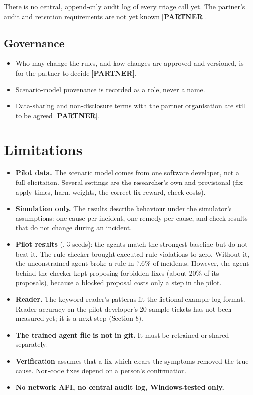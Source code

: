 \documentclass[11pt,a4paper]{article}
\newcommand{\code}[1]{\path{#1}}
\newcommand{\partner}{\textbf{[PARTNER]}}
\begin{document}
There is no central, append-only audit log of every triage call yet. The partner's audit and
retention requirements are not yet known \partner.

\subsection*{Governance}

\begin{itemize}
\item Who may change the rules, and how changes are approved and versioned, is for the partner to
  decide \partner.
\item Scenario-model provenance is recorded as a role, never a name.
\item Data-sharing and non-disclosure terms with the partner organisation are still to be
  agreed \partner.
\end{itemize}

\section{Limitations}

\begin{itemize}
\item \textbf{Pilot data.} The scenario model comes from one software developer, not a full
  elicitation. Several settings are the researcher's own and provisional (fix apply times, harm
  weights, the correct-fix reward, check costs).
\item \textbf{Simulation only.} The results describe behaviour under the simulator's assumptions:
  one cause per incident, one remedy per cause, and check results that do not change during an
  incident.
\item \textbf{Pilot results} (\code{documentation/pilot_report.md}, 3 seeds): the agents match the
  strongest baseline but do not beat it. The rule checker brought executed rule violations to
  zero. Without it, the unconstrained agent broke a rule in 7.6\% of incidents. However, the
  agent behind the checker kept proposing forbidden fixes (about 20\% of its proposals), because
  a blocked proposal costs only a step in the pilot.
\item \textbf{Reader.} The keyword reader's patterns fit the fictional example log format. Reader
  accuracy on the pilot developer's 20 sample tickets has not been measured yet; it is a next
  step (Section 8).
\item \textbf{The trained agent file is not in git.} It must be retrained or shared separately.
\item \textbf{Verification} assumes that a fix which clears the symptoms removed the true cause.
  Non-code fixes depend on a person's confirmation.
\item \textbf{No network API, no central audit log, Windows-tested only.}
\end{itemize}
\end{document}
